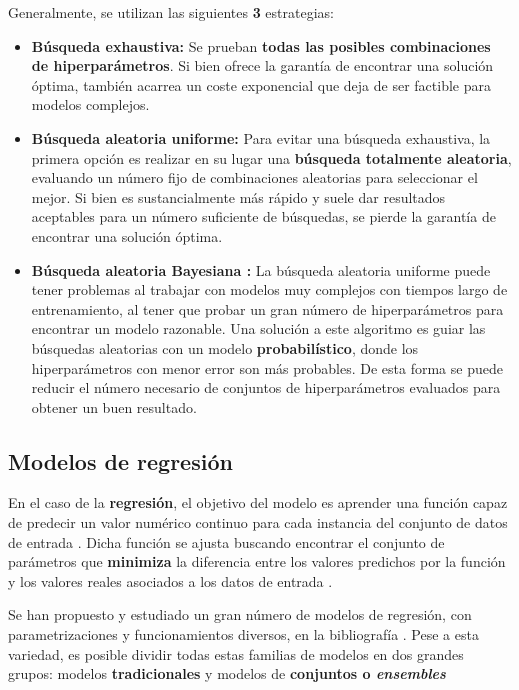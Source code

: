 Generalmente, se utilizan las siguientes \textbf{3} estrategias:
\begin{itemize}[parsep=1pt, itemsep=1pt, topsep=4pt]
	\item \textbf{Búsqueda exhaustiva:} Se prueban \textbf{todas las posibles combinaciones de hiperparámetros}. Si bien ofrece la garantía de encontrar una solución óptima, también acarrea un coste exponencial que deja de ser factible para modelos complejos.
	
	\item \textbf{Búsqueda aleatoria uniforme:} Para evitar una búsqueda exhaustiva, la primera opción es realizar en su lugar una \textbf{búsqueda totalmente aleatoria}, evaluando un número fijo de combinaciones aleatorias para seleccionar el mejor. Si bien es sustancialmente más rápido y suele dar resultados aceptables para un número suficiente de búsquedas, se pierde la garantía de encontrar una solución óptima.
	
	\item \textbf{Búsqueda aleatoria Bayesiana \cite{bayesianoptimization}:} La búsqueda aleatoria uniforme puede tener problemas al trabajar con modelos muy complejos con tiempos largo de entrenamiento, al tener que probar un gran número de hiperparámetros para encontrar un modelo razonable. Una solución a este algoritmo es guiar las búsquedas aleatorias con un modelo \textbf{probabilístico}, donde los hiperparámetros con menor error son más probables. De esta forma se puede reducir el número necesario de conjuntos de hiperparámetros evaluados para obtener un buen resultado. 
\end{itemize}

\subsection{Modelos de regresión}

En el caso de la \textbf{regresión}, el objetivo del modelo es aprender una función capaz de predecir un valor numérico continuo para cada instancia del conjunto de datos de entrada \cite{mlprobabilistic}. Dicha función se ajusta buscando encontrar el conjunto de parámetros que \textbf{minimiza} la diferencia entre los valores predichos por la función y los valores reales asociados a los datos de entrada \cite{Burkov2019TheHM}.

Se han propuesto y estudiado un gran número de modelos de regresión, con parametrizaciones y funcionamientos diversos, en la bibliografía \cite{tai2021surveyregressionalgorithmsconnections}. Pese a esta variedad, es posible dividir todas estas familias de modelos en dos grandes grupos: modelos \textbf{tradicionales} y modelos de \textbf{conjuntos o \textit{ensembles}} \cite{aima}

